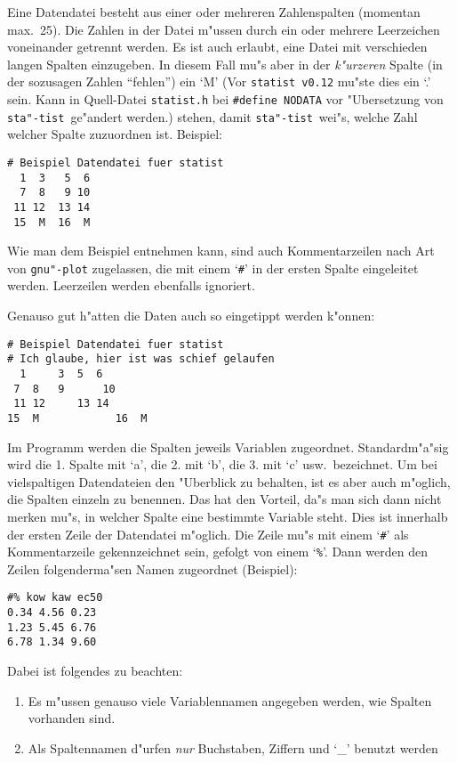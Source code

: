 \documentclass[a4paper,11pt]{article}
\newcommand{\st}{{\tt sta"-tist}}
\begin{document}
Eine Datendatei besteht aus einer oder mehreren Zahlenspalten
(momentan max.\ 25). Die Zahlen in der Datei m"ussen durch ein oder
mehrere Leerzeichen voneinander getrennt werden. Es ist auch erlaubt,
eine Datei mit verschieden langen Spalten einzugeben. In diesem Fall
mu"s aber in der {\em k"urzeren\/} Spalte (in der sozusagen Zahlen
"`fehlen"') ein `M' {(Vor {\tt statist v0.12} mu"ste dies ein `.' sein.
Kann in Quell-Datei {\tt statist.h} bei {\tt \verb|#define NODATA|} 
vor "Ubersetzung von \st\ ge"andert werden.)}
stehen, damit \st\ wei"s, welche Zahl welcher
Spalte zuzuordnen ist. Beispiel:

\begin{verbatim}
# Beispiel Datendatei fuer statist
  1  3   5  6
  7  8   9 10
 11 12  13 14
 15  M  16  M
\end{verbatim}

Wie man dem Beispiel entnehmen kann, sind auch Kommentarzeilen nach Art von
{\tt gnu"-plot} zugelassen, die mit einem `{\tt\#}' in der ersten Spalte
eingeleitet werden. Leerzeilen werden ebenfalls ignoriert.

Genauso gut h"atten die Daten auch so eingetippt werden k"onnen:

\begin{verbatim}
# Beispiel Datendatei fuer statist
# Ich glaube, hier ist was schief gelaufen
  1     3  5  6
 7  8   9      10
 11 12     13 14
15  M            16  M
\end{verbatim}

Im Programm werden die Spalten jeweils Variablen zugeordnet.
Standardm"a"sig wird die 1. Spalte mit `a', die 2. mit `b', die 3. mit
`c' usw.\ bezeichnet.  Um bei vielspaltigen Datendateien den "Uberblick
zu behalten, ist es aber auch m"oglich, die Spalten einzeln zu
benennen. Das hat den Vorteil, da"s man sich dann nicht merken mu"s,
in welcher Spalte eine bestimmte Variable steht. Dies ist innerhalb
der ersten Zeile der Datendatei m"oglich. Die Zeile mu"s mit einem
`{\tt\#}' als Kommentarzeile gekennzeichnet sein, gefolgt von einem
`{\tt\%}'. Dann werden den Zeilen folgenderma"sen Namen zugeordnet
(Beispiel):

\begin{verbatim}
#% kow kaw ec50
0.34 4.56 0.23
1.23 5.45 6.76
6.78 1.34 9.60
\end{verbatim}

Dabei ist folgendes zu beachten:
\begin{enumerate}
\item Es m"ussen genauso viele Variablennamen angegeben werden, wie
  Spalten vorhanden sind.
\item Als Spaltennamen d"urfen {\em nur\/} Buchstaben, Ziffern
  und `\_' benutzt werden
\end{enumerate}
\end{document}
